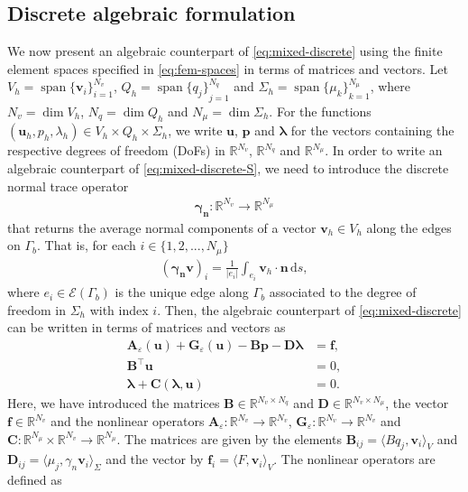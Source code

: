 \documentclass[onefignum,onetabnum]{siamart190516}
\newcommand{\RR}{\mathbb{R}}
\newcommand{\bn}{\boldsymbol{n}}
\newcommand{\bu}{\boldsymbol{u}}
\newcommand{\bv}{\boldsymbol{v}}
\newcommand{\blambda}{\boldsymbol{\lambda}}
\newcommand{\dd}{\mathrm{d}}
\newcommand{\Ec}{\mathcal{E}}
\DeclareMathOperator*{\Span}{span}
\begin{document}
\subsection{Discrete algebraic formulation}

We now present an algebraic counterpart of \eqref{eq:mixed-discrete} using the finite element spaces specified in \eqref{eq:fem-spaces} in terms of matrices and vectors. Let $V_h = \Span{\{\bv_i\}}_{i=1}^{N_v}$, $Q_h = \Span{\{q_j\}}_{j=1}^{N_q}$ and $\Sigma_h = \Span{\{\mu_k\}}_{k=1}^{N_\mu}$, where $N_v = \dim{V_h}$, $N_q = \dim{Q_h}$ and $N_\mu = \dim{\Sigma_h}$. For the functions $(\bu_h, p_h, \lambda_h) \in V_h\times Q_h\times \Sigma_h$, we write $\mathbf{u}$, $\mathbf{p}$ and $\blambda$ for the vectors containing the respective degrees of freedom (DoFs) in $\RR^{N_v}$, $\RR^{N_q}$ and $\RR^{N_\mu}$. In order to write an algebraic counterpart of \eqref{eq:mixed-discrete-S}, we need to introduce the discrete normal trace operator 
\begin{align*}
	\boldsymbol{\gamma_n} : \RR^{N_v} \to \RR^{N_\mu}
\end{align*}
that returns the average normal components of a vector $\bv_h\in V_h$ along the edges on $\Gamma_b$. That is, for each $i \in \{1,2,...,N_\mu\}$
%
\begin{align*}
	(\boldsymbol{\gamma_n} \mathbf{v})_i = \frac{1}{|e_i|} \int_{e_i} \bv_h\cdot\bn\,\dd s,
\end{align*}
%
where $e_i \in \Ec(\Gamma_b)$ is the unique edge along $\Gamma_b$ associated to the degree of freedom in $\Sigma_h$ with index $i$. Then, the algebraic counterpart of  \eqref{eq:mixed-discrete} can be written in terms of matrices and vectors as
%
\begin{subequations}\label{eq:algebraic}
	\begin{align}
		\mathbf{A}_\varepsilon(\mathbf{u}) + \mathbf{G}_\varepsilon(\mathbf{u}) - \mathbf{B} \mathbf{p} - \mathbf{D}\boldsymbol{\lambda} &= \mathbf{f},\label{eq:algebraic-1}\\
		\mathbf{B}^\top\mathbf{u} &= 0, \label{eq:algebraic-2}\\
		\blambda + \mathbf{C}(\blambda,\mathbf{u}) &= 0 \label{eq:algebraic-3}.
	\end{align}
\end{subequations}
%
Here, we have introduced the matrices $\mathbf{B}\in\RR^{N_v\times N_q}$ and $\mathbf{D}\in\RR^{N_v\times N_\mu}$, the vector $\mathbf{f}\in\RR^{N_v}$ and the nonlinear operators $\mathbf{A}_\varepsilon:\RR^{N_v}\to\RR^{N_v}$, $\mathbf{G}_\varepsilon:\RR^{N_v}\to\RR^{N_v}$ and $\mathbf{C}:\RR^{N_\mu}\times\RR^{N_v}\to \RR^{N_\mu}$. The matrices are given by the elements $\mathbf{B}_{ij} = \langle Bq_j, \bv_i\rangle_V$ and $\mathbf{D}_{ij} = \langle \mu_j, \gamma_n\bv_i \rangle_{\Sigma}$ and the vector by $\mathbf{f}_i = \langle F, \bv_i \rangle_V$. The nonlinear operators are defined as
\end{document}
